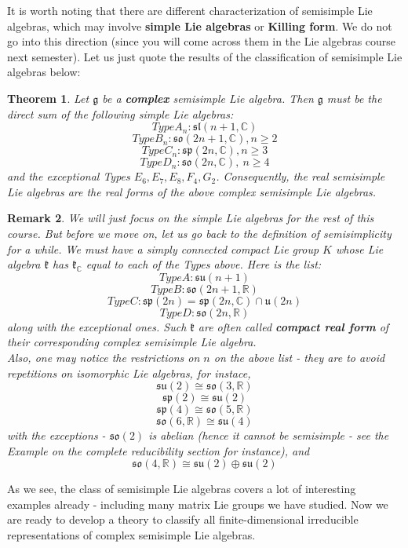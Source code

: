 \documentclass[11pt]{book}
\newtheorem{theorem}{Theorem}[section]
\newtheorem{remark}[theorem]{Remark}
\newcommand{\bb}[1]{\mathbb{#1}}
\newcommand{\mf}[1]{\mathfrak{#1}}
\begin{document}
It is worth noting that there are different characterization of semisimple Lie algebras, which may involve \textbf{simple Lie algebras} or \textbf{Killing form}. We do not go into this direction (since you will come across them in the Lie algebras course next semester). Let us just quote the results of the classification of semisimple Lie algebras below:
\begin{theorem}
Let $\mf{g}$ be a \textbf{complex} semisimple Lie algebra. Then $\mf{g}$ must be the direct sum of the following simple Lie algebras:
$$Type A_n: \mf{sl}(n+1,\bb{C})$$
$$Type B_n: \mf{so}(2n+1,\bb{C}), n \geq 2$$
$$Type C_n: \mf{sp}(2n,\bb{C}), n \geq 3$$
$$Type D_n: \mf{so}(2n,\bb{C}),\ n \geq 4$$
and the exceptional Types $E_6, E_7, E_8, F_4, G_2$.
Consequently, the real semisimple Lie algebras are the real forms of the above complex semisimple Lie algebras.
\end{theorem}
\begin{remark}
We will just focus on the simple Lie algebras for the rest of this course. But before we move on, let us go back to the definition of semisimplicity for a while. We must have a simply connected compact Lie group $K$ whose Lie algebra $\mf{k}$ has $\mf{k}_{\bb{C}}$ equal to each of the Types above. Here is the list:
$$Type A: \mf{su}(n+1)$$
$$Type B: \mf{so}(2n+1,\bb{R})$$
$$Type C: \mf{sp}(2n) = \mf{sp}(2n,\bb{C}) \cap \mf{u}(2n)$$
$$Type D: \mf{so}(2n,\bb{R})$$
along with the exceptional ones. Such $\mf{k}$ are often called \textbf{compact real form} of their corresponding complex semisimple Lie algebra.\\
Also, one may notice the restrictions on $n$ on the above list - they are to avoid repetitions on isomorphic Lie algebras, for instace,
$$\mf{su}(2) \cong \mf{so}(3,\bb{R})$$
$$\mf{sp}(2) \cong \mf{su}(2)$$
$$\mf{sp}(4) \cong \mf{so}(5,\bb{R})$$
$$\mf{so}(6,\bb{R}) \cong \mf{su}(4)$$
with the exceptions - $\mf{so}(2)$ is abelian (hence it cannot be semisimple - see the Example on the complete reducibility section for instance), and
$$\mf{so}(4,\bb{R}) \cong \mf{su}(2) \oplus \mf{su}(2)$$
\end{remark}
As we see, the class of semisimple Lie algebras covers a lot of interesting examples already - including many matrix Lie groups we have studied. Now we are ready to develop a theory to classify all finite-dimensional irreducible representations of complex semisimple Lie algebras.
\end{document}
